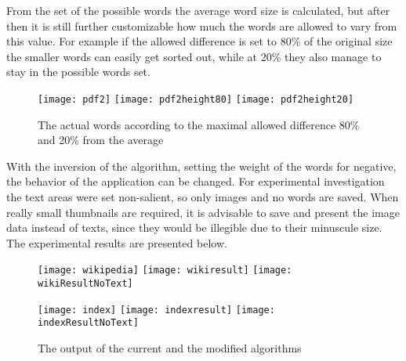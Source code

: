 \documentclass[draft,final]{vutinfth} %
\begin{document}
	From the set of the possible words the average word size is calculated, but after then it is still further customizable how much the words are allowed to vary from this value.
	For example if the allowed difference is set to 80\% of the original size the smaller words can easily get sorted out, while at 20\% they also manage to stay in the possible words set.\par 
	\begin{figure}[H]
		\texttt{[image: pdf2]}\hfill
		\texttt{[image: pdf2height80]}\hfill
		\texttt{[image: pdf2height20]}
		\caption{The actual words according to the maximal allowed difference 80\% and 20\% from the average  }
	\end{figure}  
	With the inversion of the algorithm, setting the weight of the words for negative, the behavior of the application can be changed.
	For experimental investigation the text areas were set non-salient, so only images and no words are saved. 
	When really small thumbnails are required, it  is advisable to save and present the image data instead of texts, since they would be illegible due to their minuscule size.  
	The experimental results are presented below.
	\begin{figure}[H]		
		\texttt{[image: wikipedia]}\hfill
		\texttt{[image: wikiresult]}\hfill
		\texttt{[image: wikiResultNoText]}
	
		\texttt{[image: index]}\hfill
		\texttt{[image: indexresult]}\hfill
		\texttt{[image: indexResultNoText]}
	
		\caption{The output of the current and the modified algorithms }
	\end{figure} 
\end{document}
